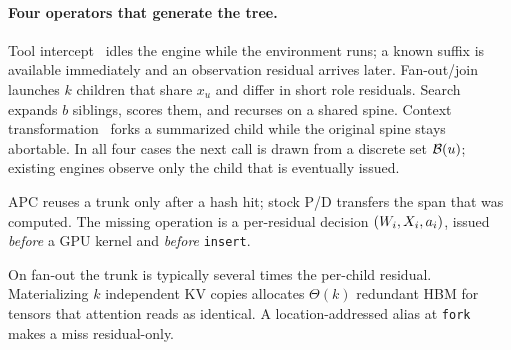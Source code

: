 \paragraph{Four operators that generate the tree.}
Tool intercept~\cite{react,toolformer} idles the engine while the environment runs; a known suffix is available immediately and an observation residual arrives later.
Fan-out/join~\cite{autogen,metagpt} launches $k$ children that share $x_u$ and differ in short role residuals.
Search~\cite{tot,hive} expands $b$ siblings, scores them, and recurses on a shared spine.
Context transformation~\cite{smoothagent} forks a summarized child while the original spine stays abortable.
In all four cases the next call is drawn from a discrete set $\mathcal{B}(u)$; existing engines observe only the child that is eventually issued.

\begin{insight}
\label{ins:prune}
APC reuses a trunk only after a hash hit; stock P/D transfers the span that was computed.
The missing operation is a per-residual decision $(W_i,X_i,a_i)$, issued \emph{before} a GPU kernel and \emph{before} \texttt{insert}.
\end{insight}

\begin{insight}
\label{ins:fork}
On fan-out the trunk is typically several times the per-child residual.
Materializing $k$ independent KV copies allocates $\Theta(k)$ redundant HBM for tensors that attention reads as identical.
A location-addressed alias at \texttt{fork} makes a miss residual-only.
\end{insight}

